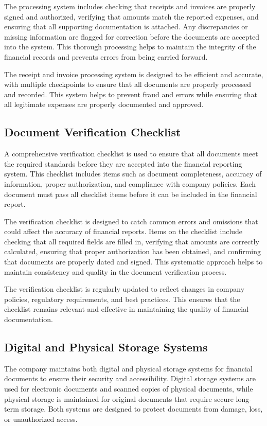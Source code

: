 The processing system includes checking that receipts and invoices are properly signed and authorized, verifying that amounts match the reported expenses, and ensuring that all supporting documentation is attached. Any discrepancies or missing information are flagged for correction before the documents are accepted into the system. This thorough processing helps to maintain the integrity of the financial records and prevents errors from being carried forward.

The receipt and invoice processing system is designed to be efficient and accurate, with multiple checkpoints to ensure that all documents are properly processed and recorded. This system helps to prevent fraud and errors while ensuring that all legitimate expenses are properly documented and approved.

\subsection{Document Verification Checklist}
A comprehensive verification checklist is used to ensure that all documents meet the required standards before they are accepted into the financial reporting system. This checklist includes items such as document completeness, accuracy of information, proper authorization, and compliance with company policies. Each document must pass all checklist items before it can be included in the financial report.

The verification checklist is designed to catch common errors and omissions that could affect the accuracy of financial reports. Items on the checklist include checking that all required fields are filled in, verifying that amounts are correctly calculated, ensuring that proper authorization has been obtained, and confirming that documents are properly dated and signed. This systematic approach helps to maintain consistency and quality in the document verification process.

The verification checklist is regularly updated to reflect changes in company policies, regulatory requirements, and best practices. This ensures that the checklist remains relevant and effective in maintaining the quality of financial documentation.

\subsection{Digital and Physical Storage Systems}
The company maintains both digital and physical storage systems for financial documents to ensure their security and accessibility. Digital storage systems are used for electronic documents and scanned copies of physical documents, while physical storage is maintained for original documents that require secure long-term storage. Both systems are designed to protect documents from damage, loss, or unauthorized access.

